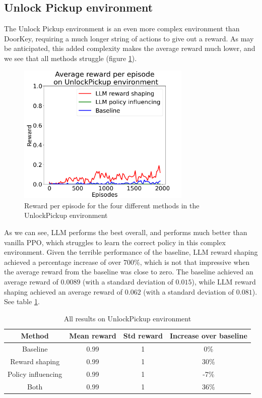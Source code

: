 \documentclass[conference]{IEEEtran}
\begin{document}
\subsection{Unlock Pickup environment}

The Unlock Pickup environment is an even more complex environment than DoorKey, requiring a much longer string of actions to give out a reward. As may be anticipated, this added complexity makes the average reward much lower, and we see that all methods struggle (figure \ref{unlockpickupresults}).

\begin{figure}[h]
\centerline{\includegraphics[width=3.25in]{figure/unlockpickupresults.png}}
\caption{Reward per episode for the four different methods in the UnlockPickup environment}
\label{unlockpickupresults}
\end{figure}

As we can see, LLM performs the best overall, and performs much better than vanilla PPO, which struggles to learn the correct policy in this complex environment. Given the terrible performance of the baseline, LLM reward shaping achieved a percentage increase of over $700\%$, which is not that impressive when the average reward from the baseline was close to zero. The baseline achieved an average reward of $0.0089$ (with a standard deviation of $0.015$), while LLM reward shaping achieved an average reward of $0.062$ (with a standard deviation of $0.081$). See table \ref{unlockpickuptable}.

\begin{table}[h]
\caption{All results on UnlockPickup environment}
\begin{center}
\label{unlockpickuptable}
\begin{tabular}{c | c c c}
Method & Mean reward & Std reward & Increase over baseline \\
\hline
Baseline & 0.99 & 1 & 0\% \\
Reward shaping & 0.99 & 1 & 30\% \\
Policy influencing & 0.99 & 1 & -7\% \\
Both & 0.99 & 1 & 36\% \\
\end{tabular}
\end{center}
\end{table}
\end{document}
